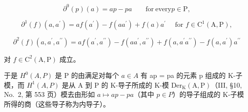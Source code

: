 \[
\partial^ {0} (p) (a) = a p - p a \qquad \mathrm{for\ every} p \in \mathrm{P},\tag{12}
\]

\[
\partial^ {1} (f) \left(a, a ^ {\prime}\right) = a f \left(a ^ {\prime}\right) - f \left(a a ^ {\prime}\right) + f (a) a ^ {\prime} \quad \text { for } f \in \mathrm{C} ^ {1} (\mathrm{A}, \mathrm{P}),\tag{13}
\]

\[
\partial^ {2} (f) \left(a, a ^ {\prime}, a ^ {\prime \prime}\right) = a f \left(a ^ {\prime}, a ^ {\prime \prime}\right) - f \left(a a ^ {\prime}, a ^ {\prime \prime}\right) + f \left(a, a ^ {\prime} a ^ {\prime \prime}\right) - f \left(a, a ^ {\prime}\right) a ^ {\prime \prime}\tag{14}
\]

对 \(f \in \mathrm{C}^2(\mathrm{A},\mathrm{P})\) 成立。

于是 \(H^{0}(A,P)\) 是 P 的由满足对每个 \(a \in A\) 有 ap = pa 的元素 p 组成的 K-子模，而 \(H^{1}(A,P)\) 是从 A 到 P 的 K-导子所成的 K-模 \(\mathrm{Der}_{\mathrm{K}}(\mathrm{A},\mathrm{P})\)（III, §10, No.~2, 第 553 页）模去由形如 \(a \mapsto ap - pa\)（其中 \(p \in P\)）的导子组成的 K-子模所得的商（这些导子称为内导子）。

